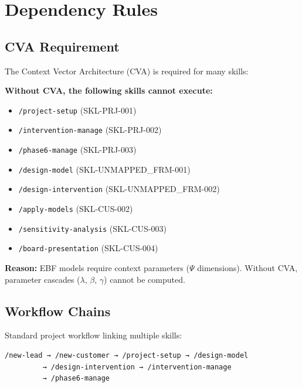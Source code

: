 \section{Dependency Rules}
\label{sec:sk-dependencies}

\subsection{CVA Requirement}

The Context Vector Architecture (CVA) is required for many skills:

\begin{tcolorbox}[colback=red!5!white, colframe=red!75!black,
    title=CVA Required Skills]

\textbf{Without CVA, the following skills cannot execute:}
\begin{itemize}[nosep]
\item \texttt{/project-setup} (SKL-PRJ-001)
\item \texttt{/intervention-manage} (SKL-PRJ-002)
\item \texttt{/phase6-manage} (SKL-PRJ-003)
\item \texttt{/design-model} (SKL-UNMAPPED_FRM-001)
\item \texttt{/design-intervention} (SKL-UNMAPPED_FRM-002)
\item \texttt{/apply-models} (SKL-CUS-002)
\item \texttt{/sensitivity-analysis} (SKL-CUS-003)
\item \texttt{/board-presentation} (SKL-CUS-004)
\end{itemize}

\textbf{Reason:} EBF models require context parameters ($\Psi$ dimensions).
Without CVA, parameter cascades ($\lambda$, $\beta$, $\gamma$) cannot be computed.

\end{tcolorbox}

\subsection{Workflow Chains}

Standard project workflow linking multiple skills:

\begin{verbatim}
/new-lead → /new-customer → /project-setup → /design-model
         → /design-intervention → /intervention-manage
         → /phase6-manage
\end{verbatim}

